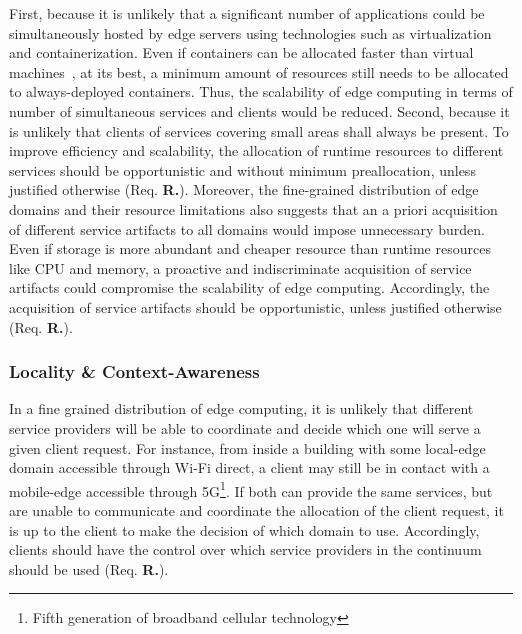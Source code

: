 



First, because it is unlikely that a significant number of applications could be simultaneously hosted by edge servers using technologies such as virtualization and containerization. Even if containers can be allocated faster than virtual machines~\cite{Quatrocchi2016discrete}, at its best, a minimum amount of resources still needs to be allocated to always-deployed containers. Thus, the scalability of edge computing in terms of number of simultaneous services and clients would be reduced. Second, because it is unlikely that clients of services covering small areas shall always be present. To improve efficiency and scalability, the allocation of runtime resources to different services should be opportunistic and without minimum preallocation, unless justified otherwise (Req. \textbf{R.}). Moreover, the fine-grained distribution of edge domains and their resource limitations also suggests that an a priori acquisition of different service artifacts to all domains would impose unnecessary burden. Even if storage is more abundant and cheaper resource than runtime resources like CPU and memory, a proactive and indiscriminate acquisition of service artifacts could compromise the scalability of edge computing. Accordingly, the acquisition of service artifacts should be opportunistic, unless justified otherwise (Req. \textbf{R.}).

\subsubsection{Locality \& Context-Awareness}\label{sec:context-awareness}


In a fine grained distribution of edge computing, it is unlikely that different service providers will be able to coordinate and decide which one will serve a given client request. For instance, from inside a building with some local-edge domain accessible through Wi-Fi direct, a client may still be in contact with a mobile-edge accessible through 5G\footnote{Fifth generation of broadband cellular technology}. If both can provide the same services, but are unable to communicate and coordinate the allocation of the client request, it is up to the client to make the decision of which domain to use. Accordingly, clients should have the control over which service providers in the continuum should be used (Req. \textbf{R.}). 

